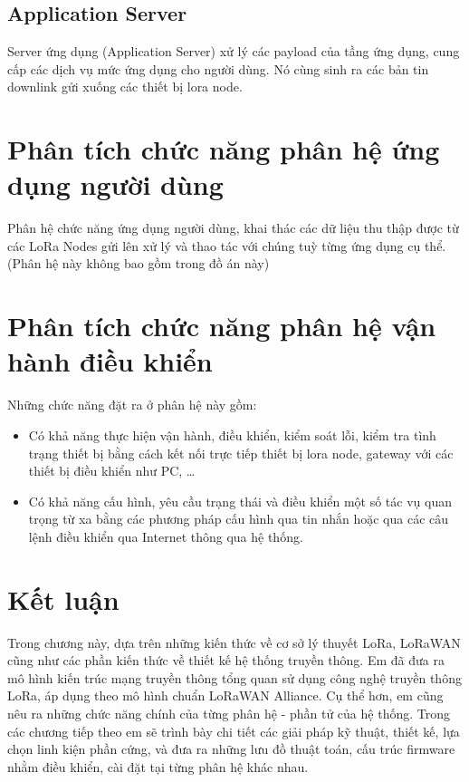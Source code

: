 \subsection{Application Server }
Server ứng dụng (Application Server) xử lý các payload của tầng ứng dụng, cung cấp các dịch vụ mức ứng dụng cho người dùng. Nó cùng sinh ra các bản tin downlink gửi xuống các thiết bị lora node.

\section{Phân tích chức năng phân hệ ứng dụng người dùng}
Phân hệ chức năng ứng dụng người dùng, khai thác các dữ liệu thu thập được từ các LoRa Nodes gửi lên xử lý và thao tác với chúng tuỳ từng ứng dụng cụ thể. (Phân hệ này không bao gồm trong đồ án này)

\section{Phân tích chức năng phân hệ vận hành điều khiển}
Những chức năng đặt ra ở phân hệ này gồm:
\begin{itemize}
\item	Có khả năng thực hiện vận hành, điều khiển, kiểm soát lỗi, kiểm tra tình trạng thiết bị bằng cách kết nối trực tiếp thiết bị lora node, gateway với các thiết bị điều khiển như PC, …
\item	Có khả năng cấu hình, yêu cầu trạng thái và điều khiển một số tác vụ quan trọng từ xa bằng các phương pháp cấu hình qua tin nhắn hoặc qua các câu lệnh điều khiển qua Internet thông qua hệ thống. 
\end{itemize}

\section{Kết luận}
Trong chương này, dựa trên những kiến thức về cơ sở lý thuyết LoRa, LoRaWAN cũng như các phần kiến thức về thiết kế hệ thống truyền thông. Em đã đưa ra mô hình kiến trúc mạng truyền thông tổng quan sử dụng công nghệ truyền thông LoRa, áp dụng theo mô hình chuẩn LoRaWAN Alliance. Cụ thể hơn, em cũng nêu ra những chức năng chính của từng phân hệ - phần tử của hệ thống. Trong các chương tiếp theo em sẽ trình bày chi tiết các giải pháp kỹ thuật, thiết kế, lựa chọn linh kiện phần cứng, và đưa ra những lưu đồ thuật toán, cấu trúc firmware nhằm điều khiển, cài đặt tại từng phân hệ khác nhau.   